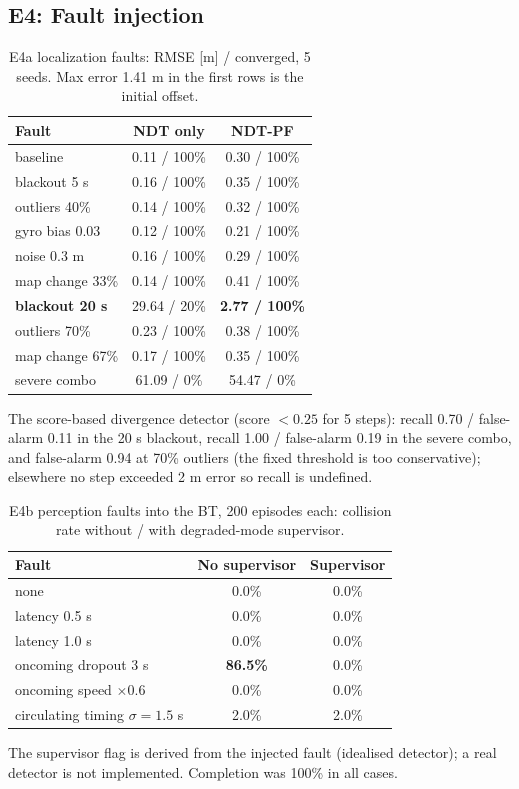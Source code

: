 \documentclass[conference]{IEEEtran}
\begin{document}
\subsection{E4: Fault injection}
\begin{table}[t]\centering\caption{E4a localization faults: RMSE [m] / converged, 5 seeds. Max error 1.41 m in the first rows is the initial offset.}\small
\begin{tabular}{@{}lcc@{}}\toprule Fault & NDT only & NDT-PF\\\midrule
baseline & 0.11 / 100\% & 0.30 / 100\%\\
blackout 5 s & 0.16 / 100\% & 0.35 / 100\%\\
outliers 40\% & 0.14 / 100\% & 0.32 / 100\%\\
gyro bias 0.03 & 0.12 / 100\% & 0.21 / 100\%\\
noise 0.3 m & 0.16 / 100\% & 0.29 / 100\%\\
map change 33\% & 0.14 / 100\% & 0.41 / 100\%\\
\textbf{blackout 20 s} & 29.64 / 20\% & \textbf{2.77 / 100\%}\\
outliers 70\% & 0.23 / 100\% & 0.38 / 100\%\\
map change 67\% & 0.17 / 100\% & 0.35 / 100\%\\
severe combo & 61.09 / 0\% & 54.47 / 0\%\\\bottomrule\end{tabular}\end{table}
The score-based divergence detector (score $<0.25$ for 5 steps): recall 0.70 / false-alarm 0.11 in the 20 s blackout, recall 1.00 / false-alarm 0.19 in the severe combo, and false-alarm 0.94 at 70\% outliers (the fixed threshold is too conservative); elsewhere no step exceeded 2 m error so recall is undefined.

\begin{table}[t]\centering\caption{E4b perception faults into the BT, 200 episodes each: collision rate without / with degraded-mode supervisor.}\small
\begin{tabular}{@{}lcc@{}}\toprule Fault & No supervisor & Supervisor\\\midrule
none & 0.0\% & 0.0\%\\latency 0.5 s & 0.0\% & 0.0\%\\latency 1.0 s & 0.0\% & 0.0\%\\
oncoming dropout 3 s & \textbf{86.5\%} & 0.0\%\\oncoming speed $\times0.6$ & 0.0\% & 0.0\%\\
circulating timing $\sigma=1.5$ s & 2.0\% & 2.0\%\\\bottomrule\end{tabular}\end{table}
The supervisor flag is derived from the injected fault (idealised detector); a real detector is not implemented. Completion was 100\% in all cases.
\end{document}
